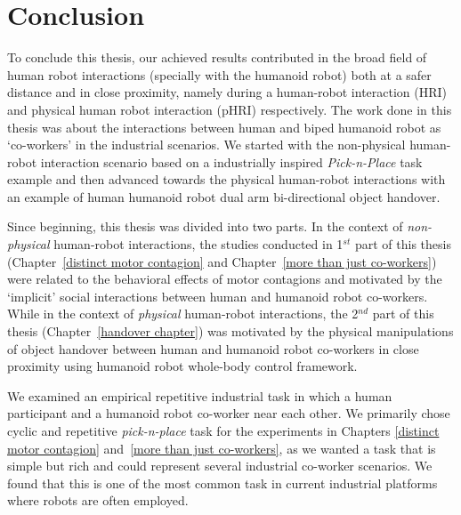 
{\color{blue}\chapter*{Conclusion}}
\pagestyle{plain}

To conclude this thesis, our achieved results contributed in the broad field of human robot interactions (specially with the humanoid robot) both at a safer distance and in close proximity, namely during a human-robot interaction (HRI) and physical human robot interaction (pHRI) respectively. The work done in this thesis was about the interactions between human and biped humanoid robot as `co-workers' in the industrial scenarios. We started with the non-physical human-robot interaction scenario based on a industrially inspired \textit{Pick-n-Place} task example and then advanced towards the physical human-robot interactions with an example of human humanoid robot dual arm bi-directional object handover.

Since beginning, this thesis was divided into two parts. In the context of \textit{non-physical} human-robot interactions, the studies conducted in 1$^{st}$ part of this thesis (Chapter~\ref{distinct motor contagion} and Chapter~\ref{more than just co-workers}) were related to the behavioral effects of motor contagions and motivated by the `implicit' social interactions between human and humanoid robot co-workers. While in the context of \textit{physical} human-robot interactions, the 2$^{nd}$ part of this thesis (Chapter~\ref{handover chapter}) was motivated by the physical manipulations of object handover between human and humanoid robot co-workers in close proximity using humanoid robot whole-body control framework.

We examined an empirical repetitive industrial task in which a human participant and a humanoid robot co-worker near each other. We primarily chose cyclic and repetitive \textit{pick-n-place} task for the experiments in Chapters \ref{distinct motor contagion} and~\ref{more than just co-workers}, as we wanted a task that is simple but rich and could represent several industrial co-worker scenarios. We found that this is one of the most common task in current industrial platforms where robots are often employed.


